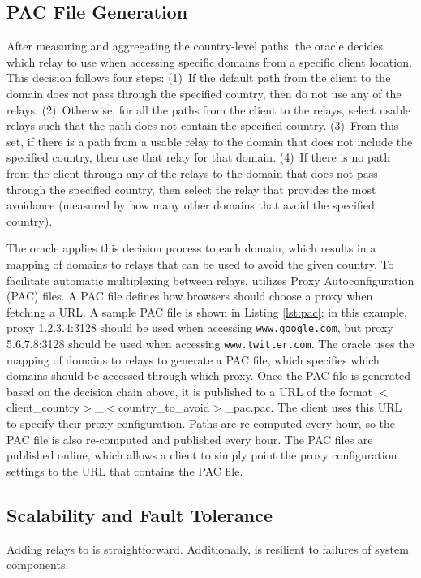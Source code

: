 \subsection{PAC File Generation}
\label{multiplex}
After measuring and aggregating the country-level paths, the oracle decides 
which relay to use when accessing specific domains from a specific client 
location.  This decision follows four steps:
(1)~If the default path from the client to the domain does not pass through 
the specified country, then do not use any of the relays. 
(2)~Otherwise, for all the paths from the client to the relays, select usable relays 
such that the path does not contain the specified country.
(3)~From this set, if there is a path from a 
usable relay to the domain that does not include the specified country, then 
use that relay for that domain.
(4)~If there is no path from the client through any of the relays to the domain 
that does not pass through the specified country, then select the relay 
that provides the most avoidance (measured by how many other domains
that avoid the specified country). 

The oracle applies this decision process to each domain, which results in a mapping 
of domains to relays that can be used to avoid the given country.  To facilitate 
automatic multiplexing between relays, \system{} utilizes Proxy Autoconfiguration (PAC) 
files.  A PAC file defines how browsers should choose a proxy when fetching a URL.  A 
sample PAC file is shown in Listing \ref{lst:pac}; in this example, proxy 
1.2.3.4:3128 should be used when accessing {\tt www.google.com}, but proxy 
5.6.7.8:3128 should be used when accessing {\tt www.twitter.com}.  The oracle uses 
the mapping of domains to relays to generate a PAC 
file, which specifies which domains should be accessed through which proxy.  Once the PAC 
file is generated based on the decision chain above, it is published to a URL 
of the format $<$client\_country$>$\_$<$country\_to\_avoid$>$\_pac.pac.  The client 
uses this URL to specify their proxy configuration.  Paths are re-computed 
every hour, so the PAC file is also re-computed and published every hour.  The PAC files 
are published online, which allows a client to simply point the proxy
configuration settings to the URL that contains the PAC file. 

\renewcommand{\lstlistingname}{Configuration}


\subsection{Scalability and Fault Tolerance}
Adding relays to \system{} is 
straightforward. Additionally, \system{} is resilient to failures of system components.

